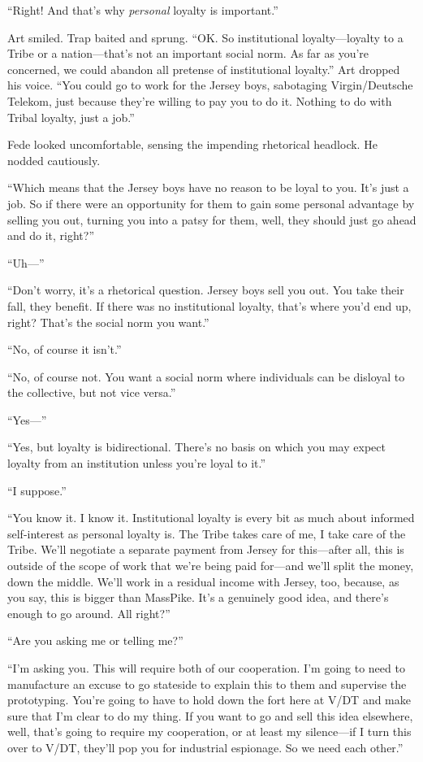 “Right! And that’s why \emph{personal} loyalty is important.”

Art smiled. Trap baited and sprung. “OK. So institutional
loyalty—loyalty to a Tribe or a nation—that’s not an important
social norm. As far as you’re concerned, we could abandon all
pretense of institutional loyalty.” Art dropped his voice. “You
could go to work for the Jersey boys, sabotaging Virgin/Deutsche
Telekom, just because they’re willing to pay you to do it. Nothing
to do with Tribal loyalty, just a job.”

Fede looked uncomfortable, sensing the impending rhetorical
headlock. He nodded cautiously.

“Which means that the Jersey boys have no reason to be loyal to
you. It’s just a job. So if there were an opportunity for them to
gain some personal advantage by selling you out, turning you into a
patsy for them, well, they should just go ahead and do it, right?”

“Uh—”

“Don’t worry, it’s a rhetorical question. Jersey boys sell you out.
You take their fall, they benefit. If there was no institutional
loyalty, that’s where you’d end up, right? That’s the social norm
you want.”

“No, of course it isn’t.”

“No, of course not. You want a social norm where individuals can be
disloyal to the collective, but not vice versa.”

“Yes—”

“Yes, but loyalty is bidirectional. There’s no basis on which you
may expect loyalty from an institution unless you’re loyal to it.”

“I suppose.”

“You know it. I know it. Institutional loyalty is every bit as much
about informed self-interest as personal loyalty is. The Tribe
takes care of me, I take care of the Tribe. We’ll negotiate a
separate payment from Jersey for this—after all, this is outside of
the scope of work that we’re being paid for—and we’ll split the
money, down the middle. We’ll work in a residual income with
Jersey, too, because, as you say, this is bigger than MassPike.
It’s a genuinely good idea, and there’s enough to go around. All
right?”

“Are you asking me or telling me?”

“I’m asking you. This will require both of our cooperation. I’m
going to need to manufacture an excuse to go stateside to explain
this to them and supervise the prototyping. You’re going to have to
hold down the fort here at V/DT and make sure that I’m clear to do
my thing. If you want to go and sell this idea elsewhere, well,
that’s going to require my cooperation, or at least my silence—if I
turn this over to V/DT, they’ll pop you for industrial espionage.
So we need each other.”

